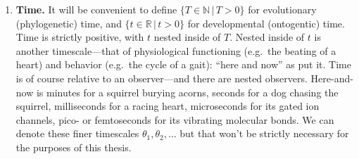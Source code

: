 \begin{enumerate}

    \item \textbf{Time.} It will be convenient to define $\{T\in\mathbb{N} \,|\, T>0\}$ for evolutionary (phylogenetic) time, and $\{t\in\mathbb{R} \,|\, t>0\}$ for developmental (ontogentic) time.
    Time is strictly positive, with $t$ nested inside of $T$.
    Nested inside of $t$ is another timescale---that of physiological functioning (e.g.~the beating of a heart) and behavior (e.g.~the cycle of a gait):
    ``here and now'' as \citet{pfeifer2006body} put it.
    Time is of course relative to an observer---and there are nested observers.
    Here-and-now is minutes for a squirrel burying acorns, seconds for a dog chasing the squirrel, milliseconds for a racing heart, microseconds for its gated ion channels, pico- or femtoseconds for its vibrating molecular bonds.
    We can denote these finer timescales $\theta_1, \theta_2, \ldots$
    but that won't be strictly necessary for the purposes of this thesis.
    

\end{enumerate}
